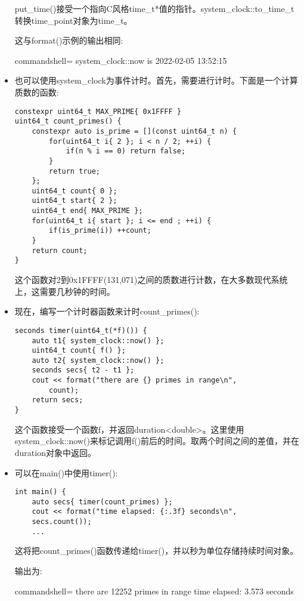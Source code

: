 \begin{itemize}
put\_time()接受一个指向C风格time\_t*值的指针。system\_clock::to\_time\_t转换time\_point对象为time\_t。

这与format()示例的输出相同:

\begin{tcblisting}{commandshell={}}
system_clock::now is 2022-02-05 13:52:15
\end{tcblisting}

\item 
也可以使用system\_clock为事件计时。首先，需要进行计时。下面是一个计算质数的函数:

\begin{lstlisting}[style=styleCXX]
constexpr uint64_t MAX_PRIME{ 0x1FFFF }
uint64_t count_primes() {
	constexpr auto is_prime = [](const uint64_t n) {
		for(uint64_t i{ 2 }; i < n / 2; ++i) {
			if(n % i == 0) return false;
		}
		return true;
	};
	uint64_t count{ 0 };
	uint64_t start{ 2 };
	uint64_t end{ MAX_PRIME };
	for(uint64_t i{ start }; i <= end ; ++i) {
		if(is_prime(i)) ++count;
	}
	return count;
}
\end{lstlisting}

这个函数对2到0x1FFFF(131,071)之间的质数进行计数，在大多数现代系统上，这需要几秒钟的时间。

\item 
现在，编写一个计时器函数来计时count\_primes():

\begin{lstlisting}[style=styleCXX]
seconds timer(uint64_t(*f)()) {
	auto t1{ system_clock::now() };
	uint64_t count{ f() };
	auto t2{ system_clock::now() };
	seconds secs{ t2 - t1 };
	cout << format("there are {} primes in range\n",
		count);
	return secs;
}
\end{lstlisting}

这个函数接受一个函数f，并返回duration<double>。这里使用system\_clock::now()来标记调用f()前后的时间。取两个时间之间的差值，并在duration对象中返回。

\item 
可以在main()中使用timer():

\begin{lstlisting}[style=styleCXX]
int main() {
	auto secs{ timer(count_primes) };
	cout << format("time elapsed: {:.3f} seconds\n",
	secs.count());
	...
\end{lstlisting}

这将把count\_primes()函数传递给timer()，并以秒为单位存储持续时间对象。

输出为:

\begin{tcblisting}{commandshell={}}
there are 12252 primes in range
time elapsed: 3.573 seconds
\end{tcblisting}


\end{itemize}
